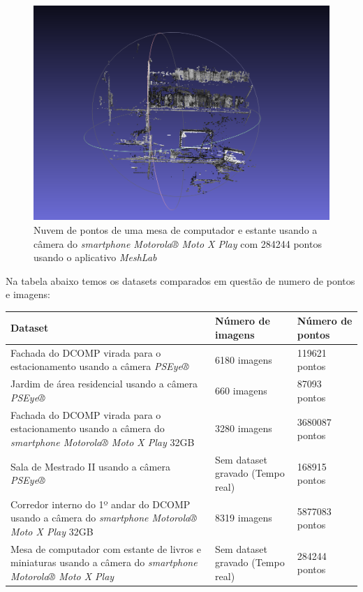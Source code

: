 \begin{figure}[H]
	\centering
		\includegraphics[width= \textwidth]{Imagens/mesacomputadorPC.PNG}
	\caption{Nuvem de pontos de uma mesa de computador e estante usando a câmera do  \textit{smartphone Motorola® Moto X Play} com 284244 pontos usando o aplicativo \textit{MeshLab}}
\end{figure}

Na tabela abaixo temos os datasets comparados em questão de numero de pontos e imagens:

\noindent
\begin{tabular}{| p{} | p{} | p{} |}
\hline
Dataset & Número de imagens & Número de pontos\\
\hline
Fachada do DCOMP virada para o estacionamento usando a câmera \textit{PSEye®} & 6180 imagens & 119621 pontos \\
\hline
Jardim de área residencial usando a câmera \textit{PSEye®} & 660 imagens & 87093 pontos\\
\hline
Fachada do DCOMP virada para o estacionamento usando a câmera do \textit{smartphone Motorola® Moto X Play} 32GB & 3280 imagens & 3680087 pontos\\
\hline
Sala de Mestrado II usando a câmera \textit{PSEye®} & Sem dataset gravado (Tempo real) & 168915 pontos\\
\hline
Corredor interno do 1º andar do DCOMP usando a câmera do \textit{smartphone Motorola® Moto X Play} 32GB & 8319 imagens & 5877083 pontos\\
\hline
Mesa de computador com estante de livros e miniaturas usando a câmera do \textit{smartphone Motorola® Moto X Play} &  Sem dataset gravado (Tempo real)  & 284244 pontos\\
\hline
\end{tabular}


